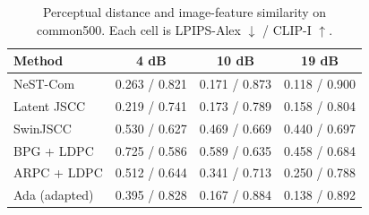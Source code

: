 \begin{table}[t]
\caption{Perceptual distance and image-feature similarity on common500. Each cell is LPIPS-Alex $\downarrow$ / CLIP-I $\uparrow$.}
\label{tab:external}
\centering\footnotesize
\setlength{\tabcolsep}{3pt}
\begin{tabular}{lccc}
\toprule Method & 4 dB & 10 dB & 19 dB \\
\midrule
NeST-Com & 0.263 / 0.821 & 0.171 / 0.873 & 0.118 / 0.900 \\
Latent JSCC & 0.219 / 0.741 & 0.173 / 0.789 & 0.158 / 0.804 \\
SwinJSCC & 0.530 / 0.627 & 0.469 / 0.669 & 0.440 / 0.697 \\
BPG + LDPC & 0.725 / 0.586 & 0.589 / 0.635 & 0.458 / 0.684 \\
ARPC + LDPC & 0.512 / 0.644 & 0.341 / 0.713 & 0.250 / 0.788 \\
Ada (adapted) & 0.395 / 0.828 & 0.167 / 0.884 & 0.138 / 0.892 \\
\bottomrule
\end{tabular}
\end{table}
